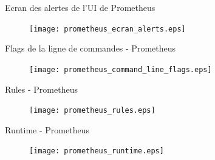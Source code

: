 \begin{frame}[fragile]{Ecran des alertes de l'UI de Prometheus}

\begin{figure}
\begin{center}
\texttt{[image: prometheus\_ecran\_alerts.eps]}
\end{center}
\end{figure}

\end{frame}


\begin{frame}[fragile]{Flags de la ligne de commandes - Prometheus}

\begin{figure}
\begin{center}
\texttt{[image: prometheus\_command\_line\_flags.eps]}
\end{center}
\end{figure}

\end{frame}


\begin{frame}[fragile]{Rules - Prometheus}

\begin{figure}
\begin{center}
\texttt{[image: prometheus\_rules.eps]}
\end{center}
\end{figure}

\end{frame}


\begin{frame}[fragile]{Runtime - Prometheus}

\begin{figure}
\begin{center}
\texttt{[image: prometheus\_runtime.eps]}
\end{center}
\end{figure}

\end{frame}



